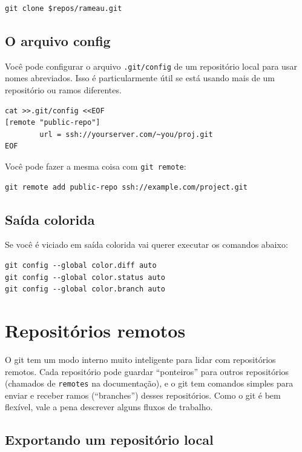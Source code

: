 \documentclass[12pt,brazil]{book}
\begin{document}
\begin{verbatim}
git clone $repos/rameau.git
\end{verbatim}

\subsection{O arquivo config}
\label{sec:o-arquivo-config}

Você pode configurar o arquivo \texttt{.git/config} de um repositório
local para usar nomes abreviados. Isso é particularmente útil se está
usando mais de um repositório ou ramos diferentes.

\begin{verbatim}
cat >>.git/config <<EOF
[remote "public-repo"]
        url = ssh://yourserver.com/~you/proj.git
EOF
\end{verbatim}

Você pode fazer a mesma coisa com \texttt{git remote}:

\begin{verbatim}
git remote add public-repo ssh://example.com/project.git
\end{verbatim}

\subsection{Saída colorida}
\label{sec:saida-colorida}

Se você é viciado em saída colorida vai querer executar os comandos abaixo:

\begin{verbatim}
git config --global color.diff auto
git config --global color.status auto
git config --global color.branch auto
\end{verbatim}

\section{Repositórios remotos}
\label{sec:remote}


O git tem um modo interno muito inteligente para lidar com
repositórios remotos. Cada repositório pode guardar ``ponteiros'' para
outros repositórios (chamados de \texttt{remotes} na documentação), e
o git tem comandos simples para enviar e receber ramos (``branches'')
desses repositórios. Como o git é bem flexível, vale a pena descrever
alguns fluxos de trabalho.

\subsection{Exportando um repositório local}
\label{sec:export-local}
\end{document}
